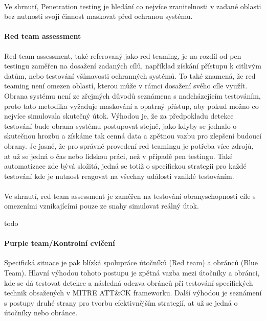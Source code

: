 \paragraph{}
Ve shrnutí, Penetration testing je hledání co nejvíce zranitelnosti v zadané oblasti bez nutnosti svoji činnost maskovat před ochranou systému.\cite{securityInteligence_pen_test_red_team_purple_team, lootsec_pen_test_vs_red_team, astra_pen_test_vs_red_teaming}


\paragraph{Red team assessment}

Red team assessment, také referovaný jako red teaming, je na rozdíl od pen testingu zaměřen na dosažení zadaných cílů, například získání přístupu k citlivým datům, nebo testování všímavosti ochranných systémů.
To také znamená, že red teaming není omezen oblastí, kterou může v rámci dosažení svého cíle využít.
Obrana systému není ze zřejmých důvodů seznámena s nadcházejícím testováním, proto tato metodika vyžaduje maskování a opatrný přístup, aby pokud možno co nejvíce simulovala skutečný útok.
Výhodou je, že za předpokladu detekce testování bude obrana systému postupovat stejně, jako kdyby se jednalo o skutečnou hrozbu a získáme tak cenná data a zpětnou vazbu pro zlepšení budoucí obrany.
Je jasné, že pro správné provedení red teamingu je potřeba více zdrojů, at už se jedná o čas nebo lidskou práci, než v případě pen testingu.
Také automatizace zde bývá složitá, jedná se totiž o specifickou strategii pro každé testování kde je nutnost reagovat na všechny události vzniklé testováním.\cite{securityInteligence_pen_test_red_team_purple_team, lootsec_pen_test_vs_red_team, astra_pen_test_vs_red_teaming}

\paragraph{}
Ve shrnutí, red team assessment je zaměřen na testování obranyschopnosti cíle s omezeními vznikajícími pouze ze snahy simulovat reálný útok.

todo\cite{red_team_oakley_2019}

\paragraph{Purple team/Kontrolní cvičení}
Specifická situace je pak blízká spolupráce útočníků (Red team) a obránců (Blue Team).
Hlavní výhodou tohoto postupu je zpětná vazba mezi útočníky a obránci, kde se dá testovat detekce a následná odezva obránců při testování specifických technik obsažených v MITRE ATT\&CK frameworku.
Další výhodou je seznámení s postupy druhé strany pro tvorbu efektivnějším strategií, at už se jedná o útočníky nebo obránce.
